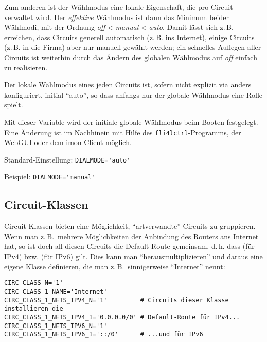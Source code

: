 Zum anderen ist der Wählmodus eine lokale Eigenschaft, die pro Circuit verwaltet
wird. Der \emph{effektive} Wählmodus ist dann das Minimum beider Wählmodi, mit
der Ordnung \emph{off} < \emph{manual} < \emph{auto}. Damit lässt sich z.\,B.
erreichen, dass Circuits generell automatisch (z.\,B. ins Internet), einige
Circuits (z.\,B. in die Firma) aber nur manuell gewählt werden; ein schnelles
Auflegen aller Circuits ist weiterhin durch das Ändern des globalen Wählmodus
auf \emph{off} einfach zu realisieren.

Der lokale Wählmodus eines jeden Circuits ist, sofern nicht explizit via
 anders konfiguriert, initial
``auto'', so dass anfangs nur der globale Wählmodus eine Rolle spielt.

\begin{description}


Mit dieser Variable wird der initiale globale Wählmodus beim Booten festgelegt.
Eine Änderung ist im Nachhinein mit Hilfe des \texttt{fli4lctrl}-Programms, der
WebGUI oder dem imon-Client möglich.

Standard-Einstellung: \verb+DIALMODE='auto'+

Beispiel: \verb+DIALMODE='manual'+

\end{description}

\subsection{Circuit-Klassen}\label{sec:circuits:classes}

Circuit-Klassen bieten eine Möglichkeit, ``artverwandte'' Circuits zu
gruppieren. Wenn man z.\,B.\ mehrere Möglichkeiten der Anbindung des Routers
ans Internet hat, so ist doch all diesen Circuits die Default-Route gemeinsam,
d.\,h. dass  (für IPv4) bzw.
 (für IPv6) gilt. Dies kann man
``herausmultiplizieren'' und daraus eine eigene Klasse definieren, die man
z.\,B.\ sinnigerweise ``Internet'' nennt:

\begin{example}
\begin{verbatim}
CIRC_CLASS_N='1'
CIRC_CLASS_1_NAME='Internet'
CIRC_CLASS_1_NETS_IPV4_N='1'         # Circuits dieser Klasse installieren die
CIRC_CLASS_1_NETS_IPV4_1='0.0.0.0/0' # Default-Route für IPv4...
CIRC_CLASS_1_NETS_IPV6_N='1'
CIRC_CLASS_1_NETS_IPV6_1='::/0'      # ...und für IPv6
\end{verbatim}
\end{example}

